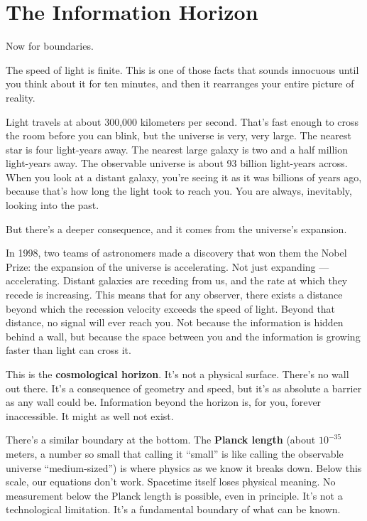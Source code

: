 \documentclass[11pt, twoside, openright]{book}
\begin{document}
\section*{The Information Horizon}

Now for boundaries.

The speed of light is finite. This is one of those facts that sounds innocuous until you think about it for ten minutes, and then it rearranges your entire picture of reality.

Light travels at about 300,000 kilometers per second. That's fast enough to cross the room before you can blink, but the universe is very, very large. The nearest star is four light-years away. The nearest large galaxy is two and a half million light-years away. The observable universe is about 93 billion light-years across. When you look at a distant galaxy, you're seeing it as it was billions of years ago, because that's how long the light took to reach you. You are always, inevitably, looking into the past.

But there's a deeper consequence, and it comes from the universe's expansion.

In 1998, two teams of astronomers made a discovery that won them the Nobel Prize: the expansion of the universe is accelerating. Not just expanding --- accelerating. Distant galaxies are receding from us, and the rate at which they recede is increasing. This means that for any observer, there exists a distance beyond which the recession velocity exceeds the speed of light. Beyond that distance, no signal will ever reach you. Not because the information is hidden behind a wall, but because the space between you and the information is growing faster than light can cross it.

This is the \textbf{cosmological horizon}. It's not a physical surface. There's no wall out there. It's a consequence of geometry and speed, but it's as absolute a barrier as any wall could be. Information beyond the horizon is, for you, forever inaccessible. It might as well not exist.

There's a similar boundary at the bottom. The \textbf{Planck length} (about $10^{-35}$ meters, a number so small that calling it ``small'' is like calling the observable universe ``medium-sized'') is where physics as we know it breaks down. Below this scale, our equations don't work. Spacetime itself loses physical meaning. No measurement below the Planck length is possible, even in principle. It's not a technological limitation. It's a fundamental boundary of what can be known.
\end{document}
